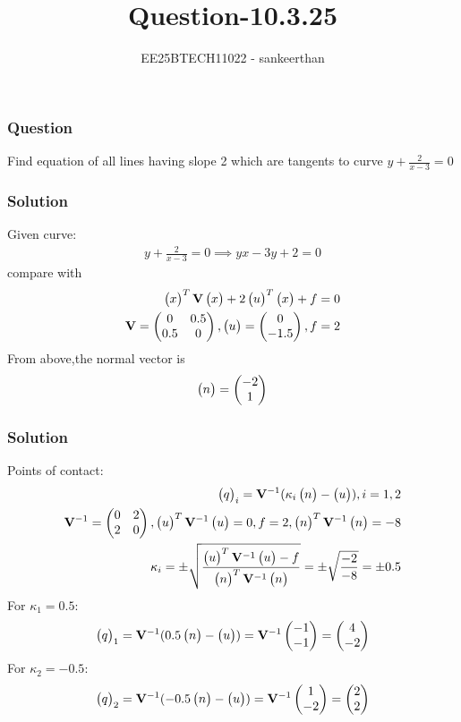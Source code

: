 \documentclass{beamer}
\title{Question-10.3.25}
\author{EE25BTECH11022 - sankeerthan}
\date{}
\begin{document}
\frame{\titlepage}

\begin{frame}
\frametitle{Question}
Find equation of all lines having slope 2 which are tangents to curve $y+\frac{2}{x-3}=0$
\end{frame}

\begin{frame}
\frametitle{Solution}
Given curve:
\begin{align}
y + \frac{2}{x-3} = 0
\implies yx - 3y + 2 = 0
\end{align}
compare with
\begin{align}
\begin{pmatrix}x\end{pmatrix}^T \mathbf{V} \begin{pmatrix}x\end{pmatrix} + 2\begin{pmatrix}u\end{pmatrix}^T \begin{pmatrix}x\end{pmatrix} + f = 0 \\
\mathbf{V} = \begin{pmatrix} 0 & 0
.5 \\ 0.5 & 0 \end{pmatrix},\begin{pmatrix}u\end{pmatrix} = \begin{pmatrix}0 \\ -1.5\end{pmatrix},f = 2
\end{align}
From above,the normal vector is
\begin{align}
\begin{pmatrix}n\end{pmatrix} = \begin{pmatrix}-2 \\ 1\end{pmatrix}
\end{align}
\end{frame}

\begin{frame}
\frametitle{Solution}
Points of contact: 
\begin{align}
\begin{pmatrix}q\end{pmatrix}_i = \mathbf{V}^{-1}(\kappa_i \begin{pmatrix}n\end{pmatrix} - \begin{pmatrix}u\end{pmatrix}),i = 1,2 \\
\mathbf{V}^{-1} = \begin{pmatrix} 0 & 2 \\ 2 & 0 \end{pmatrix},\begin{pmatrix}u\end{pmatrix}^T \mathbf{V}^{-1} \begin{pmatrix}u\end{pmatrix} = 0,f = 2,\begin{pmatrix}n\end{pmatrix}^T \mathbf{V}^{-1} \begin{pmatrix}n\end{pmatrix} = -8\\
\kappa_i = \pm \sqrt{\frac{\begin{pmatrix}u\end{pmatrix}^T \mathbf{V}^{-1} \begin{pmatrix}u\end{pmatrix} - f}{\begin{pmatrix}n\end{pmatrix}^T \mathbf{V}^{-1} \begin{pmatrix}n\end{pmatrix}}} = \pm \sqrt{ \frac{-2}{-8} } = \pm 0.5  
\end{align}
For $\kappa_1 = 0.5$: 
\begin{align}
\begin{pmatrix}q\end{pmatrix}_1 = \mathbf{V}^{-1}(0.5\begin{pmatrix}n\end{pmatrix} - \begin{pmatrix}u\end{pmatrix}) = \mathbf{V}^{-1}\begin{pmatrix}-1 \\ -1\end{pmatrix} = \begin{pmatrix}4 \\ -2\end{pmatrix} 
\end{align}
For $\kappa_2 = -0.5$:  
\begin{align}
\begin{pmatrix}q\end{pmatrix}_2 = \mathbf{V}^{-1}(-0.5\begin{pmatrix}n\end{pmatrix} - \begin{pmatrix}u\end{pmatrix}) = \mathbf{V}^{-1}\begin{pmatrix}1 \\ -2\end{pmatrix} = \begin{pmatrix}2 \\ 2\end{pmatrix} 
\end{align}
\end{frame}
\end{document}
